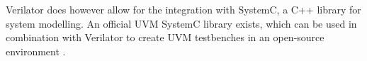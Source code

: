 Verilator does however allow for the integration with SystemC, a C++ library for system modelling. An official UVM
SystemC library exists, which can be used in combination with Verilator to create UVM testbenches in an open-source
environment \cite{Sasselli2023}.

